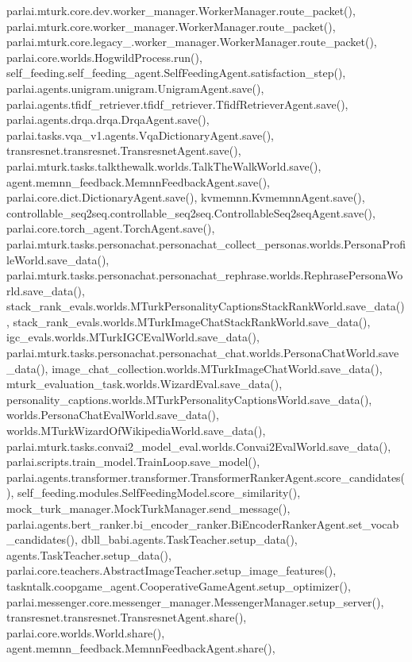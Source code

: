 parlai.\+mturk.\+core.\+dev.\+worker\+\_\+manager.\+Worker\+Manager.\+route\+\_\+packet(), parlai.\+mturk.\+core.\+worker\+\_\+manager.\+Worker\+Manager.\+route\+\_\+packet(), parlai.\+mturk.\+core.\+legacy\+\_.\+worker\+\_\+manager.\+Worker\+Manager.\+route\+\_\+packet(), parlai.\+core.\+worlds.\+Hogwild\+Process.\+run(), self\+\_\+feeding.\+self\+\_\+feeding\+\_\+agent.\+Self\+Feeding\+Agent.\+satisfaction\+\_\+step(), parlai.\+agents.\+unigram.\+unigram.\+Unigram\+Agent.\+save(), parlai.\+agents.\+tfidf\+\_\+retriever.\+tfidf\+\_\+retriever.\+Tfidf\+Retriever\+Agent.\+save(), parlai.\+agents.\+drqa.\+drqa.\+Drqa\+Agent.\+save(), parlai.\+tasks.\+vqa\+\_\+v1.\+agents.\+Vqa\+Dictionary\+Agent.\+save(), transresnet.\+transresnet.\+Transresnet\+Agent.\+save(), parlai.\+mturk.\+tasks.\+talkthewalk.\+worlds.\+Talk\+The\+Walk\+World.\+save(), agent.\+memnn\+\_\+feedback.\+Memnn\+Feedback\+Agent.\+save(), parlai.\+core.\+dict.\+Dictionary\+Agent.\+save(), kvmemnn.\+Kvmemnn\+Agent.\+save(), controllable\+\_\+seq2seq.\+controllable\+\_\+seq2seq.\+Controllable\+Seq2seq\+Agent.\+save(), parlai.\+core.\+torch\+\_\+agent.\+Torch\+Agent.\+save(), parlai.\+mturk.\+tasks.\+personachat.\+personachat\+\_\+collect\+\_\+personas.\+worlds.\+Persona\+Profile\+World.\+save\+\_\+data(), parlai.\+mturk.\+tasks.\+personachat.\+personachat\+\_\+rephrase.\+worlds.\+Rephrase\+Persona\+World.\+save\+\_\+data(), stack\+\_\+rank\+\_\+evals.\+worlds.\+M\+Turk\+Personality\+Captions\+Stack\+Rank\+World.\+save\+\_\+data(), stack\+\_\+rank\+\_\+evals.\+worlds.\+M\+Turk\+Image\+Chat\+Stack\+Rank\+World.\+save\+\_\+data(), igc\+\_\+evals.\+worlds.\+M\+Turk\+I\+G\+C\+Eval\+World.\+save\+\_\+data(), parlai.\+mturk.\+tasks.\+personachat.\+personachat\+\_\+chat.\+worlds.\+Persona\+Chat\+World.\+save\+\_\+data(), image\+\_\+chat\+\_\+collection.\+worlds.\+M\+Turk\+Image\+Chat\+World.\+save\+\_\+data(), mturk\+\_\+evaluation\+\_\+task.\+worlds.\+Wizard\+Eval.\+save\+\_\+data(), personality\+\_\+captions.\+worlds.\+M\+Turk\+Personality\+Captions\+World.\+save\+\_\+data(), worlds.\+Persona\+Chat\+Eval\+World.\+save\+\_\+data(), worlds.\+M\+Turk\+Wizard\+Of\+Wikipedia\+World.\+save\+\_\+data(), parlai.\+mturk.\+tasks.\+convai2\+\_\+model\+\_\+eval.\+worlds.\+Convai2\+Eval\+World.\+save\+\_\+data(), parlai.\+scripts.\+train\+\_\+model.\+Train\+Loop.\+save\+\_\+model(), parlai.\+agents.\+transformer.\+transformer.\+Transformer\+Ranker\+Agent.\+score\+\_\+candidates(), self\+\_\+feeding.\+modules.\+Self\+Feeding\+Model.\+score\+\_\+similarity(), mock\+\_\+turk\+\_\+manager.\+Mock\+Turk\+Manager.\+send\+\_\+message(), parlai.\+agents.\+bert\+\_\+ranker.\+bi\+\_\+encoder\+\_\+ranker.\+Bi\+Encoder\+Ranker\+Agent.\+set\+\_\+vocab\+\_\+candidates(), dbll\+\_\+babi.\+agents.\+Task\+Teacher.\+setup\+\_\+data(), agents.\+Task\+Teacher.\+setup\+\_\+data(), parlai.\+core.\+teachers.\+Abstract\+Image\+Teacher.\+setup\+\_\+image\+\_\+features(), taskntalk.\+coopgame\+\_\+agent.\+Cooperative\+Game\+Agent.\+setup\+\_\+optimizer(), parlai.\+messenger.\+core.\+messenger\+\_\+manager.\+Messenger\+Manager.\+setup\+\_\+server(), transresnet.\+transresnet.\+Transresnet\+Agent.\+share(), parlai.\+core.\+worlds.\+World.\+share(), agent.\+memnn\+\_\+feedback.\+Memnn\+Feedback\+Agent.\+share(), 